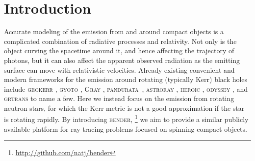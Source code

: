 \documentclass{aa}
\begin{document}
\maketitle


\section{Introduction}
Accurate modeling of the emission from and around compact objects is a complicated combination of radiative processes and relativity.
Not only is the object curving the spacetime around it, and hence affecting the trajectory of photons, but it can also affect the apparent observed radiation as the emitting surface can move with relativistic velocities.
Already existing convenient and modern frameworks for the emission around rotating (typically Kerr) black holes include \textsc{geokerr} \citep{dexter2009}, \textsc{gyoto} \citep{Vincent11}, \textsc{Gray} \citep{CPO13}, \textsc{pandurata} \citep{SK13}, \textsc{astroray} \citep{SM13}, \textsc{heroic} \citep{NZP16}, \textsc{odyssey} \citep{PYY16}, and \textsc{grtrans} \citep{dexter2016} to name a few.
Here we instead focus on the emission from rotating neutron stars, for which the Kerr metric is not a good approximation if the star is rotating rapidly.
By introducing \textsc{bender},%
\footnote{ \url{ http://github.com/natj/bender} } 
we aim to provide a similar publicly available platform for ray tracing problems focused on spinning compact objects.
\end{document}
